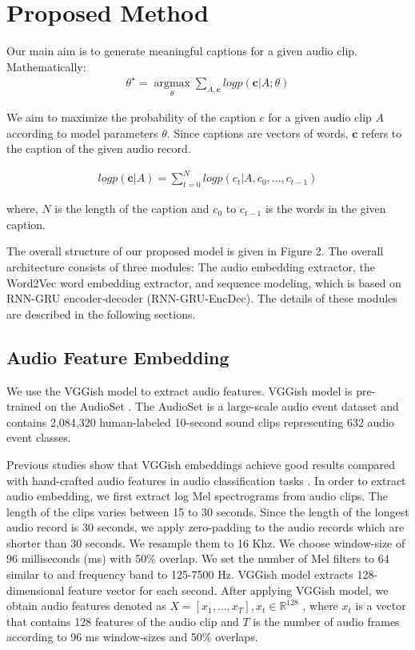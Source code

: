 \documentclass{article}
\begin{document}
\section{Proposed Method}

Our main aim is to generate meaningful captions for a given audio clip. Mathematically: 
\begin{equation}
\begin{aligned}
\theta^{\star}=\underset{\theta}{\operatorname{argmax}} 
\sum_{A,\textbf{c}} logp(\textbf{c}|A;\theta) 
\end{aligned}
\end{equation} 

We aim to maximize the probability of the caption $c$ for a given audio clip $A$ according to model parameters $\theta$. Since captions are vectors of words, $\textbf{c}$ refers to the caption of the given audio record.

\begin{equation}
\begin{aligned}
logp(\textbf{c}|A) = \sum_{t=0}^{N} logp(c_t|A,c_0,...,c_{t-1}) 
\end{aligned}
\end{equation} 

where, $N$ is the length of the caption and $c_0$ to $c_{t-1}$ is the words in the given caption.

The overall structure of our proposed model is given in Figure 2. The overall architecture consists of three modules: The audio embedding extractor, the Word2Vec word embedding extractor, and sequence modeling, which is based on RNN-GRU encoder-decoder (RNN-GRU-EncDec). The details of these modules are described in the following sections.


\subsection{Audio Feature Embedding}
We use the VGGish model to extract audio features. VGGish model is pre-trained on the AudioSet \cite{7952261}. The AudioSet is a large-scale audio event dataset and contains 2,084,320 human-labeled 10-second sound clips representing 632 audio event classes.

Previous studies show that VGGish embeddings achieve good results compared with hand-crafted audio features in audio classification tasks \cite{DBLP:journals/corr/abs-1905-01926,Basbug2019}. In order to extract audio embedding, we first extract log Mel spectrograms from audio clips. The length of the clips varies between 15 to 30 seconds. Since the length of the longest audio record is 30 seconds, we apply zero-padding to the audio records which are shorter than 30 seconds. We resample them to 16 Khz. We choose window-size of 96 milliseconds (ms) with 50\% overlap. We set the number of Mel filters to 64 similar to \cite{Drossos_2020} and frequency band to 125-7500 Hz. VGGish model extracts 128-dimensional feature vector for each second. After applying VGGish model, we obtain audio features denoted as $X=[x_1,...,x_T], x_t \in \mathbb{R}^{128}$ , where $x_t$ is a vector that contains 128 features of the audio clip and $T$ is the number of audio frames according to 96 ms window-sizes and 50\% overlaps.
\end{document}
